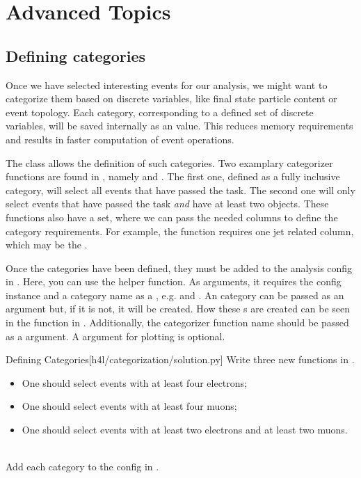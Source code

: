 \chapter{Advanced Topics}\label{chap:advanced}
\section{Defining categories}\label{sec:categories}

Once we have selected interesting events for our analysis, we might want to categorize them based on discrete variables, like final state particle content or event topology.
Each category, corresponding to a defined set of discrete variables, will be saved internally as an  value. This reduces memory requirements and results in faster computation of event operations.

The  class allows the definition of such categories. Two examplary categorizer functions are found in , namely  and .
The first one, defined as a fully inclusive category, will select all events that have passed the  task. The second one will only select events that have passed the  task \textit{and} have at least two  objects.
These functions also have a  set, where we can pass the needed columns to define the category requirements. For example, the  function requires one jet related column, which may be the .

Once the categories have been defined, they must be added to the analysis config in . Here, you can use the  helper function.
As arguments, it requires the config instance and a category name as a , e.g.  and . An  category  can be passed as an argument but, if it is not, it will be created.
How these s are created can be seen in the function  in .
Additionally, the categorizer function name should be passed as a  argument. A  argument for plotting is optional.

\newpage

\begin{exercise}{Defining Categories}[h4l/categorization/solution.py]
	Write three new  functions in .
    \begin{itemize}
    \item One should select events with at least four electrons;
    \item One should select events with at least four muons;
    \item One should select events with at least two electrons and at least two muons.
    \end{itemize} \\
    Add each category to the config in .
\end{exercise}

